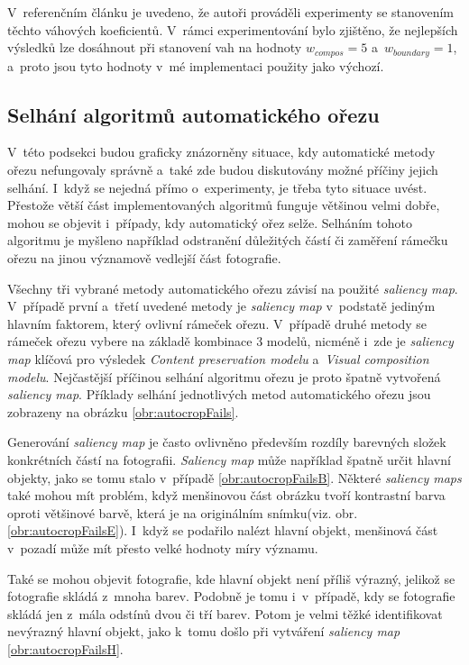 V~referenčním článku \cite{Fang2014} je uvedeno, že autoři prováděli experimenty se stanovením těchto váhových koeficientů. V~rámci experimentování bylo zjištěno, že nejlepších výsledků lze dosáhnout při stanovení vah na hodnoty $w_{compos}=5$ a~$w_{boundary}=1$, a~proto jsou tyto hodnoty v~mé implementaci použity jako výchozí. 


\subsection{Selhání algoritmů automatického ořezu}
V~této podsekci budou graficky znázorněny situace, kdy automatické metody ořezu nefungovaly správně a~také zde budou diskutovány možné příčiny jejich selhání. I~když se nejedná přímo o~experimenty, je třeba tyto situace uvést. Přestože větší část implementovaných algoritmů funguje většinou velmi dobře, mohou se objevit i~případy, kdy automatický ořez selže. Selháním tohoto algoritmu je myšleno například odstranění důležitých částí či zaměření rámečku ořezu na jinou významově vedlejší část fotografie.

Všechny tři vybrané metody automatického ořezu závisí na použité \emph{saliency map}. V~případě první a~třetí uvedené metody \cite{Stentiford2007,Suh2003} je \emph{saliency map} v~podstatě jediným hlavním faktorem, který ovlivní rámeček ořezu. V~případě druhé metody \cite{Fang2014} se rámeček ořezu vybere na základě kombinace 3 modelů, nicméně i~zde je \emph{saliency map} klíčová pro výsledek \emph{Content preservation modelu} a~\emph{Visual composition modelu}. Nejčastější příčinou selhání algoritmu ořezu je proto špatně vytvořená \emph{saliency map}. Příklady selhání jednotlivých metod automatického ořezu jsou zobrazeny na obrázku \ref{obr:autocropFails}.

Generování \emph{saliency map} je často ovlivněno především rozdíly barevných složek konkrétních částí na fotografii. \emph{Saliency map} může například špatně určit hlavní objekty, jako se tomu stalo v~případě \ref{obr:autocropFailsB}. Některé \emph{saliency maps} také mohou mít problém, když menšinovou část obrázku tvoří kontrastní barva oproti většinové barvě, která je na originálním snímku(viz. obr. \ref{obr:autocropFailsE}). I~když se podařilo nalézt hlavní objekt, menšinová část v~pozadí může mít přesto velké hodnoty míry významu.

Také se mohou objevit fotografie, kde hlavní objekt není příliš výrazný, jelikož se fotografie skládá z~mnoha barev. Podobně je tomu i~v~případě, kdy se fotografie skládá jen z~mála odstínů dvou či tří barev. Potom je velmi těžké identifikovat nevýrazný hlavní objekt, jako k~tomu došlo při vytváření \emph{saliency map} \ref{obr:autocropFailsH}.

